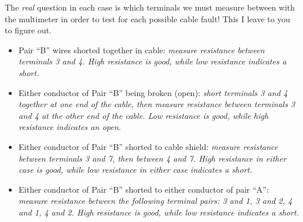 \vskip 10pt

The {\it real} question in each case is which terminals we must measure between with the multimeter in order to test for each possible cable fault!  This I leave to you to figure out.







\begin{itemize}
\item{} Pair ``B'' wires shorted together in cable: {\it measure resistance between terminals 3 and 4.  High resistance is good, while low resistance indicates a short.}
\vskip 10pt
\item{} Either conductor of Pair ``B'' being broken (open): {\it short terminals 3 and 4 together at one end of the cable, then measure resistance between terminals 3 and 4 at the other end of the cable.  Low resistance is good, while high resistance indicates an open.}
\vskip 10pt
\item{} Either conductor of Pair ``B'' shorted to cable shield: {\it measure resistance between terminals 3 and 7, then between 4 and 7.  High resistance in either case is good, while low resistance in either case indicates a short.}
\vskip 10pt
\item{} Either conductor of Pair ``B'' shorted to either conductor of pair ``A'': {\it measure resistance between the following terminal pairs: 3 and 1, 3 and 2, 4 and 1, 4 and 2.  High resistance is good, while low resistance indicates a short.}
\end{itemize}




